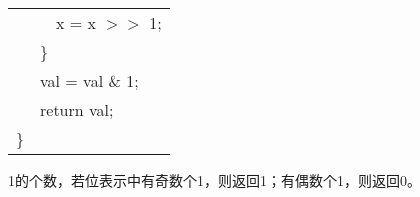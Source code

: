 \documentclass{article}
\begin{document}
\begin{CJK}{UTF8}{uyhei}
\begin{table}[ht]
\begin{tabular}{m{2em}m{2em}m{2em}l}
	&	&	\multicolumn{2}{l}{x = x $>>$ 1;}	\\
	&	\multicolumn{3}{l}{ \} } 	\\
	&	\multicolumn{3}{l}{val = val \& 1;} 	\\
	&	\multicolumn{3}{l}{return val;} 	\\
\}	\\
\end{tabular}
\end{table}	
1的个数，若位表示中有奇数个1，则返回1；有偶数个1，则返回0。	\\[2ex]




\end{CJK}
\end{document}
